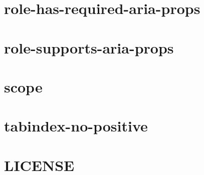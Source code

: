 \documentclass[twoside]{book}
\newcommand{\+}{\discretionary{\mbox{\scriptsize$\hookleftarrow$}}{}{}}
\begin{document}
\chapter{role-\/has-\/required-\/aria-\/props}
\label{md__c_1_workspace_demo_src_main_script_node_modules_eslint-plugin-jsx-a11y_docs_rules_role-has-required-aria-props}

\chapter{role-\/supports-\/aria-\/props}
\label{md__c_1_workspace_demo_src_main_script_node_modules_eslint-plugin-jsx-a11y_docs_rules_role-supports-aria-props}

\chapter{scope}
\label{md__c_1_workspace_demo_src_main_script_node_modules_eslint-plugin-jsx-a11y_docs_rules_scope}

\chapter{tabindex-\/no-\/positive}
\label{md__c_1_workspace_demo_src_main_script_node_modules_eslint-plugin-jsx-a11y_docs_rules_tabindex-no-positive}

\chapter{L\+I\+C\+E\+N\+SE}
\label{md__c_1_workspace_demo_src_main_script_node_modules_eslint-plugin-jsx-a11y__l_i_c_e_n_s_e}

\end{document}
